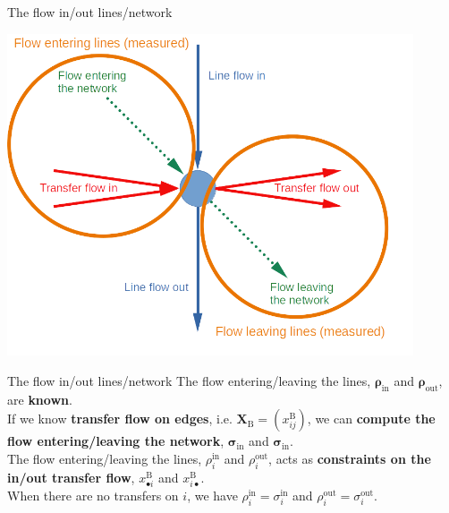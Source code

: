 \documentclass[10pt]{beamer}
\newcommand{\imp}[1]{\textbf{\color{cyan}#1}}
\begin{document}
	
	\begin{frame}{The flow in/out lines/network}
		\begin{center}
			\includegraphics[width=0.9\textwidth]{img/flow_measured.png}
		\end{center}
	\end{frame}
	
	
	\begin{frame}{The flow in/out lines/network}
		The flow entering/leaving the lines, $\bm{\rho}_\text{in}$ and $\bm{\rho}_\text{out}$, are \imp{known}. \\
		\vspace{0.4cm}
		If we know \imp{transfer flow on edges}, i.e. $\mathbf{X}_\text{B} = (x^\text{B}_{ij})$, we can \imp{compute the flow entering/leaving the network}, $\bm{\sigma}_\text{in}$ and $\bm{\sigma}_\text{in}$. \\
		\vspace{0.4cm}
		The flow entering/leaving the lines, $\rho^\text{in}_i$ and $\rho^\text{out}_i$, acts as \imp{constraints on the in/out transfer flow}, $x^\text{B}_{\bullet i}$ and $x^\text{B}_{i \bullet}$.\\
		\vspace{0.4cm}
		When there are no transfers on $i$, we have $\rho^\text{in}_i = \sigma^\text{in}_i$ and  $\rho^\text{out}_i = \sigma^\text{out}_i$. \\
	\end{frame}
	
\end{document}
